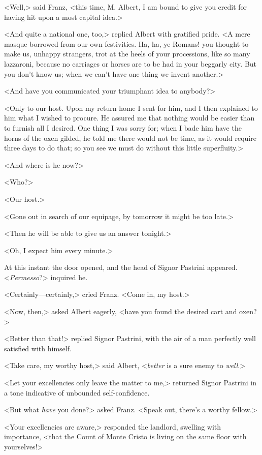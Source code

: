  <Well,> said Franz, <this time, M. Albert, I am bound to give you credit for having hit upon a most capital idea.> 

 <And quite a national one, too,> replied Albert with gratified pride. <A mere masque borrowed from our own festivities. Ha, ha, ye Romans! you thought to make us, unhappy strangers, trot at the heels of your processions, like so many lazzaroni, because no carriages or horses are to be had in your beggarly city. But you don't know us; when we can't have one thing we invent another.> 

 <And have you communicated your triumphant idea to anybody?> 

 <Only to our host. Upon my return home I sent for him, and I then explained to him what I wished to procure. He assured me that nothing would be easier than to furnish all I desired. One thing I was sorry for; when I bade him have the horns of the oxen gilded, he told me there would not be time, as it would require three days to do that; so you see we must do without this little superfluity.> 

 <And where is he now?> 

 <Who?> 

 <Our host.> 

 <Gone out in search of our equipage, by tomorrow it might be too late.> 

 <Then he will be able to give us an answer tonight.> 

 <Oh, I expect him every minute.> 

 At this instant the door opened, and the head of Signor Pastrini appeared. <\textit{Permesso}?> inquired he. 

 <Certainly—certainly,> cried Franz. <Come in, my host.> 

 <Now, then,> asked Albert eagerly, <have you found the desired cart and oxen?> 

 <Better than that!> replied Signor Pastrini, with the air of a man perfectly well satisfied with himself. 

 <Take care, my worthy host,> said Albert, <\textit{better} is a sure enemy to \textit{well}.> 

 <Let your excellencies only leave the matter to me,> returned Signor Pastrini in a tone indicative of unbounded self-confidence. 

 <But what \textit{have} you done?> asked Franz. <Speak out, there's a worthy fellow.> 

 <Your excellencies are aware,> responded the landlord, swelling with importance, <that the Count of Monte Cristo is living on the same floor with yourselves!> 

